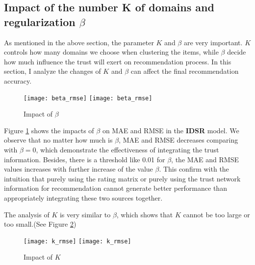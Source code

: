 \subsection{Impact of the number K of domains and regularization $\beta$}
As mentioned in the above section, the parameter $K$ and $\beta$ are very important. $K$ controls how many domains we choose when clustering the items, while $\beta$ decide how much influence the trust will exert on recommendation process. In this section, I analyze the changes of $K$ and $\beta$ can affect the final recommendation accuracy.

\begin{figure}[h]
	\caption{Impact of $\beta$}
	\label{fig:beta}
	\texttt{[image: beta\_rmse]}
	\texttt{[image: beta\_rmse]}
\end{figure}

Figure \ref{fig:beta} shows the impacts of $\beta$ on MAE and RMSE in the \textbf{IDSR} model. We observe that no matter how much is $\beta$, MAE and RMSE decreases comparing with $\beta = 0$, which demonstrate the effectiveness of integrating the trust information. Besides, there is a threshold like 0.01 for $\beta$, the MAE and RMSE values increases with further increase of the value $\beta$. This confirm with the intuition that purely using the rating matrix or purely using the trust network information for recommendation cannot generate better performance than appropriately integrating these two sources together.

The analysis of $K$ is very similar to $\beta$, which shows that $K$ cannot be too large or too small.(See Figure \ref{fig:k})
\begin{figure}[h]
	\caption{Impact of $K$}
	\label{fig:k}
	\texttt{[image: k\_rmse]}
	\texttt{[image: k\_rmse]}
\end{figure}

